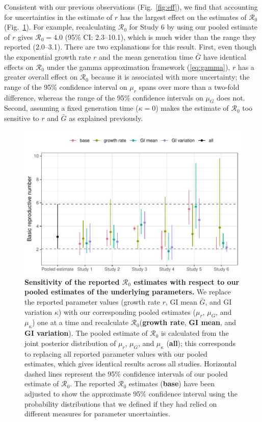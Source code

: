 \documentclass[12pt]{article}
\newcommand{\eref}[1]{(\ref{eq:#1})}
\newcommand{\fref}[1]{Fig.~\ref{fig:#1}}
\newcommand{\Rx}[1]{\ensuremath{{\mathcal R}_{#1}}}
\newcommand{\Ro}{\Rx{0}\xspace}
\begin{document}
Consistent with our previous observations (\fref{eff}),
we find that accounting for uncertainties in the estimate of $r$ has the largest effect on the estimates of \Ro (\fref{R0}).
For example, recalculating \Ro for Study 6 by using our pooled estimate of $r$ gives $\mathcal R_0 = 4.0$ (95\% CI: 2.3--10.1), which is much wider than the range they reported (2.0--3.1).
There are two explanations for this result.
First, even though the exponential growth rate $r$ and the mean generation time $\bar G$ have identical effects on \Ro under the gamma approximation framework \eref{gamma},
$r$ has a greater overall effect on \Ro because it is associated with more uncertainty;
the range of the 95\% confidence interval on $\mu_r$ spans over more than a two-fold difference, whereas the range of the 95\% confidence intervals on $\mu_G$ does not.
Second, assuming a fixed generation time ($\kappa=0$) makes the estimate of \Ro too sensitive to $r$ and $\bar G$ as explained previously.

\begin{figure}[!th]
\includegraphics[width=\textwidth]{compare_R0.pdf}
\caption{
\textbf{Sensitivity of the reported \Ro estimates with respect to our pooled estimates of the underlying parameters.}
We replace the reported parameter values (growth rate $r$, GI mean $\bar G$, and GI variation $\kappa$) with our corresponding pooled estimates ($\mu_r$, $\mu_G$, and $\mu_\kappa$) one at a time and recalculate \Ro (\textbf{growth rate}, \textbf{GI mean}, and \textbf{GI variation}).
The pooled estimate of \Ro is calculated from the joint posterior distribution of $\mu_r$, $\mu_G$, and $\mu_\kappa$ (\textbf{all});
this corresponds to replacing all reported parameter values with our pooled estimates, which gives identical results across all studies.
Horizontal dashed lines represent the 95\% confidence intervals of our pooled estimate of \Ro.
The reported \Ro estimates (\textbf{base}) have been adjusted to show the approximate 95\% confidence interval using the probability distributions that we defined if they had relied on different measures for parameter uncertainties.
}
\label{fig:R0}
\end{figure}
\end{document}
